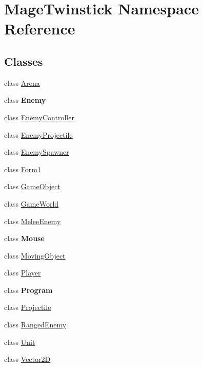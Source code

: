\hypertarget{namespace_mage_twinstick}{}\section{Mage\+Twinstick Namespace Reference}
\label{namespace_mage_twinstick}
\subsection*{Classes}
\begin{DoxyCompactItemize}
\item 
class \hyperlink{class_mage_twinstick_1_1_arena}{Arena}
\item 
class {\bfseries Enemy}
\item 
class \hyperlink{class_mage_twinstick_1_1_enemy_controller}{Enemy\+Controller}
\item 
class \hyperlink{class_mage_twinstick_1_1_enemy_projectile}{Enemy\+Projectile}
\item 
class \hyperlink{class_mage_twinstick_1_1_enemy_spawner}{Enemy\+Spawner}
\item 
class \hyperlink{class_mage_twinstick_1_1_form1}{Form1}
\item 
class \hyperlink{class_mage_twinstick_1_1_game_object}{Game\+Object}
\item 
class \hyperlink{class_mage_twinstick_1_1_game_world}{Game\+World}
\item 
class \hyperlink{class_mage_twinstick_1_1_melee_enemy}{Melee\+Enemy}
\item 
class {\bfseries Mouse}
\item 
class \hyperlink{class_mage_twinstick_1_1_moving_object}{Moving\+Object}
\item 
class \hyperlink{class_mage_twinstick_1_1_player}{Player}
\item 
class {\bfseries Program}
\item 
class \hyperlink{class_mage_twinstick_1_1_projectile}{Projectile}
\item 
class \hyperlink{class_mage_twinstick_1_1_ranged_enemy}{Ranged\+Enemy}
\item 
class \hyperlink{class_mage_twinstick_1_1_unit}{Unit}
\item 
class \hyperlink{class_mage_twinstick_1_1_vector2_d}{Vector2\+D}
\end{DoxyCompactItemize}

